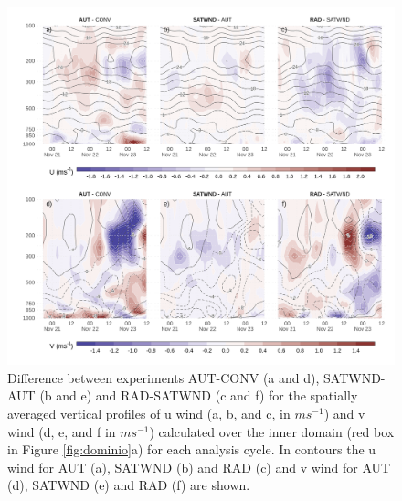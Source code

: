 \documentclass[final,5p,times,twocolumn,authoryear]{elsarticle} %
\begin{document}
\begin{figure}[ht]

{\centering \includegraphics{../figures/UV-diff-1} 

}

\caption{Difference between experiments AUT-CONV (a and d), SATWND-AUT (b and e) and RAD-SATWND (c and f) for the spatially averaged vertical profiles of u wind (a, b, and c, in \(ms^{-1}\)) and v wind (d, e, and f in \(ms^{-1}\)) calculated over the inner domain (red box in Figure \ref{fig:dominio}a) for each analysis cycle. In contours the u wind for AUT (a), SATWND (b) and RAD (c) and v wind for AUT (d), SATWND (e) and RAD (f) are shown.}\label{fig:UV-diff}
\end{figure}
\end{document}
